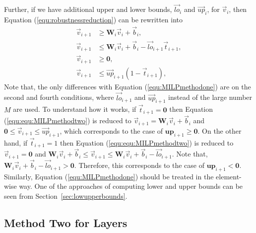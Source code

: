 Further, if we have additional upper and lower bounds, $\vec{lo}_i$ and $\vec{up}_i$, for $\vec{v}_i$, then Equation (\ref{equ:robustnessreduction}) can be rewritten into 
\begin{equation}\label{equ:equ:MILPmethodtwo}
    \begin{array}{ll}
    \vec{v}_{i+1} &\ge \textbf{W}_i \vec{v}_i + \vec{b}_i,  \\
    \vec{v}_{i+1} & \le \textbf{W}_i \vec{v}_i + \vec{b}_i - \vec{lo}_{i+1}\vec{t}_{i+1}, \\
    \vec{v}_{i+1} &\ge \textbf{0}, \\
    \vec{v}_{i+1} & \le \vec{up}_{i+1}(1-\vec{t}_{i+1}),
    \end{array}
\end{equation}
Note that, the only differences with Equation (\ref{equ:MILPmethodone}) are on the second and fourth conditions, where $\vec{lo}_{i+1}$ and $\vec{up}_{i+1}$ instead of the large number $M$ are used. To understand how it works, if $\vec{t}_{i+1}=\textbf{0}$ then Equation (\ref{equ:equ:MILPmethodtwo}) is reduced to $\vec{v}_{i+1}=\textbf{W}_i \vec{v}_i + \vec{b}_i$ and $\textbf{0}\leq \vec{v}_{i+1}\leq \vec{up}_{i+1}$, which corresponds to the case of $\textbf{up}_{i+1}\geq \textbf{0}$. On the other hand, if $\vec{t}_{i+1}=1$ then Equation (\ref{equ:equ:MILPmethodtwo}) is reduced to $\vec{v}_{i+1} = \textbf{0}$ and $\textbf{W}_i \vec{v}_i + \vec{b}_i \le \vec{v}_{i+1}\le \textbf{W}_i \vec{v}_i + \vec{b}_i - \vec{lo}_{i+1}$. Note that, $\textbf{W}_i \vec{v}_i + \vec{b}_i - \vec{lo}_{i+1}>\textbf{0}$. Therefore, this corresponds to the case of $\textbf{up}_{i+1}< \textbf{0}$. Similarly, Equation (\ref{equ:MILPmethodone}) should be treated in the element-wise way. One of the approaches of computing lower and upper bounds can be seen from Section~\ref{sec:lowupperbounds}.  

\subsection*{Method Two  for Layers} 

